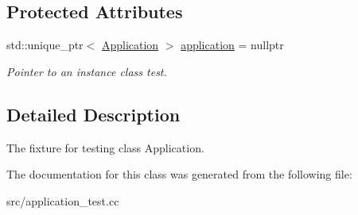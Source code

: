 \subsection*{Protected Attributes}
\begin{DoxyCompactItemize}
\item 
\hypertarget{class_application_test_ad1a2c933b0b58c4f23d7a1b51bcc30b9}{}\label{class_application_test_ad1a2c933b0b58c4f23d7a1b51bcc30b9} 
std\+::unique\+\_\+ptr$<$ \hyperlink{classae_1_1_application}{Application} $>$ \hyperlink{class_application_test_ad1a2c933b0b58c4f23d7a1b51bcc30b9}{application} = nullptr
\begin{DoxyCompactList}\small\item\em Pointer to an instance class test. \end{DoxyCompactList}\end{DoxyCompactItemize}


\subsection{Detailed Description}
The fixture for testing class Application. 

The documentation for this class was generated from the following file\+:\begin{DoxyCompactItemize}
\item 
src/application\+\_\+test.\+cc\end{DoxyCompactItemize}
